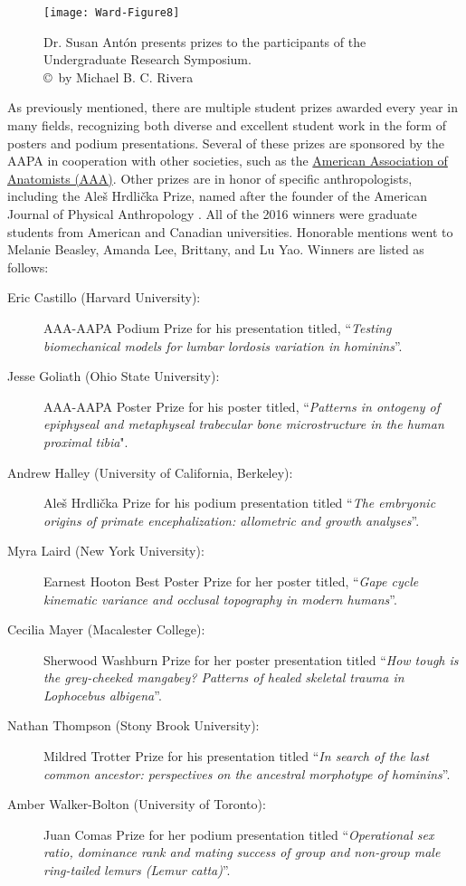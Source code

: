 \documentclass[english]{ijsra}
\def\authortwo{Michael B. C. Rivera}
\begin{document}
	\begin{figure}[!htb] %
		\centering
		\texttt{[image: Ward-Figure8]}
		\caption{Dr. Susan Antón presents prizes to the participants of the Undergraduate Research Symposium.
				{\normalfont\scriptsize \\ \copyright\ by \authortwo}}
		\label{fig:Ward-Figure8}
	\end{figure}

As previously mentioned, there are multiple student prizes awarded every year in many fields,
recognizing both diverse and excellent student work in the form of posters and podium presentations. 
Several of these prizes are sponsored by the AAPA in cooperation with other societies,
such as the \href{http://www.anatomy.org/}{American Association of Anatomists (AAA)}. 
Other prizes are in honor of specific anthropologists, including the Aleš Hrdlička Prize,
named after the founder of the American Journal of Physical Anthropology \parencite{american}.
All of the 2016 winners were graduate students from American and Canadian universities. 
Honorable mentions went to Melanie Beasley, Amanda Lee, Brittany, and Lu Yao.  
Winners are listed as follows: 
\begin{description}
  \item[Eric Castillo (Harvard University):] AAA-AAPA Podium Prize for his presentation titled, “\emph{Testing biomechanical models for lumbar lordosis variation in hominins}”.
  \item[Jesse Goliath (Ohio State University):] AAA-AAPA Poster Prize for his poster titled, “\emph{Patterns in ontogeny of epiphyseal and metaphyseal trabecular bone microstructure in the human proximal tibia}".
  \item[Andrew Halley (University of California, Berkeley):] Aleš Hrdlička Prize for his podium presentation titled “\emph{The embryonic origins of primate encephalization: allometric and growth analyses}”.
  \item[Myra Laird (New York University):] Earnest Hooton Best Poster Prize for her poster titled, “\emph{Gape cycle kinematic variance and occlusal topography in modern humans}”.
  \item[Cecilia Mayer (Macalester College):] Sherwood Washburn Prize for her poster presentation titled “\emph{How tough is the grey-cheeked mangabey? Patterns of healed skeletal trauma in \emph{Lophocebus albigena}}”.
  \item[Nathan Thompson (Stony Brook University):] Mildred Trotter Prize for his presentation titled “\emph{In search of the last common ancestor: perspectives on the ancestral morphotype of hominins}”.
  \item[Amber Walker-Bolton (University of Toronto):] Juan Comas Prize for her podium presentation titled “\emph{Operational sex ratio, dominance rank and mating success of group and non-group male ring-tailed lemurs \emph{(Lemur catta)}}”.
\end{description}
\end{document}
